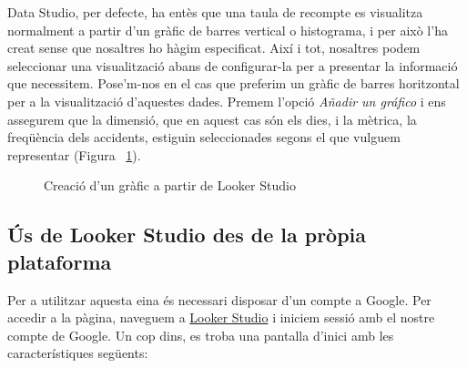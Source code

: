 \documentclass[12pt,longbibliography]{article}
\theoremstyle{definition}
\theoremstyle{remark}
\begin{document}
Data Studio, per defecte, ha entès que una taula de recompte es visualitza normalment a partir d'un gràfic de barres vertical o histograma, i per això l'ha creat sense que nosaltres ho hàgim especificat. Així i tot, nosaltres podem seleccionar una visualització abans de configurar-la per a presentar la informació que necessitem. Pose'm-nos en el cas que preferim un gràfic de barres horitzontal per a la visualització d'aquestes dades. Premem l'opció \textit{Añadir un gráfico} i ens assegurem que la dimensió, que en aquest cas són els dies, i la mètrica, la freqüència dels accidents, estiguin seleccionades segons el que vulguem representar (Figura ~\ref{fig:bq28}). 

\begin{figure}[h!]
\par
{}%
\hfill
{}%
\par

\caption{Creació d'un gràfic a partir de Looker Studio}
\label{fig:bq28}
\end{figure}

\subsection{Ús de Looker Studio des de la pròpia plataforma}

Per a utilitzar aquesta eina és necessari disposar d’un compte a Google. Per accedir a la pàgina, naveguem a \href{https://datastudio.google.com}{Looker Studio} i iniciem sessió amb el nostre compte de Google. Un cop dins, es troba una pantalla d’inici amb les característiques següents:
\end{document}
